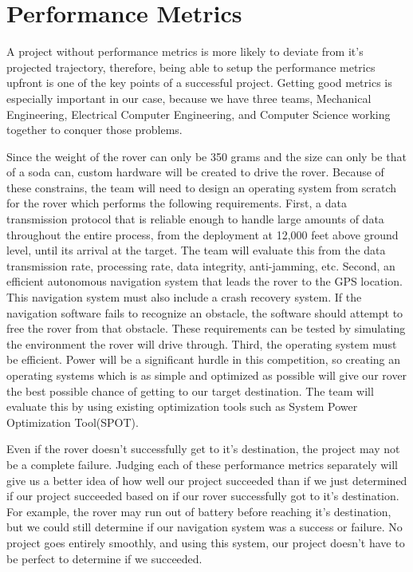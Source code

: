 \documentclass[10pt,onecolumn,draftclsnofoot,journal]{IEEEtran}
\begin{document}
\section*{\textbf{Performance Metrics}}
\noindent A project without performance metrics is more likely to deviate from it's projected trajectory, therefore, being able to setup the performance metrics upfront is one of the key points of a successful project. Getting good metrics is especially important in our case, because we have three teams, Mechanical Engineering, Electrical Computer Engineering, and Computer Science working together to conquer those problems.
\par\vspace{3mm} 
\noindent Since the weight of the rover can only be 350 grams and the size can only be that of a soda can, custom hardware will be created to drive the rover. Because of these constrains, the team will need to design an operating system from scratch for the rover which performs the following requirements. First, a data transmission protocol that is reliable enough to handle large amounts of data throughout the entire process, from the deployment at 12,000 feet above ground level, until its arrival at the target. The team will evaluate this from the data transmission rate, processing rate, data integrity, anti-jamming, etc. Second, an efficient autonomous navigation system that leads the rover to the GPS location. This navigation system must also include a crash recovery system. If the navigation software fails to recognize an obstacle, the software should attempt to free the rover from that obstacle. These requirements can be tested by simulating the environment the rover will drive through. Third, the operating system must be efficient. Power will be a significant hurdle in this competition, so creating an operating systems which is as simple and optimized as possible will give our rover the best possible chance of getting to our target destination. The team will evaluate this by using existing optimization tools such as System Power Optimization Tool(SPOT).
\par\vspace{3mm}
\noindent Even if the rover doesn't successfully get to it's destination, the project may not be a complete failure. Judging each of these performance metrics separately will give us a better idea of how well our project succeeded than if we just determined if our project succeeded based on if our rover successfully got to it's destination. For example, the rover may run out of battery before reaching it's destination, but we could still determine if our navigation system was a success or failure. No project goes entirely smoothly, and using this system, our project doesn't have to be perfect to determine if we succeeded.
\end{document}
